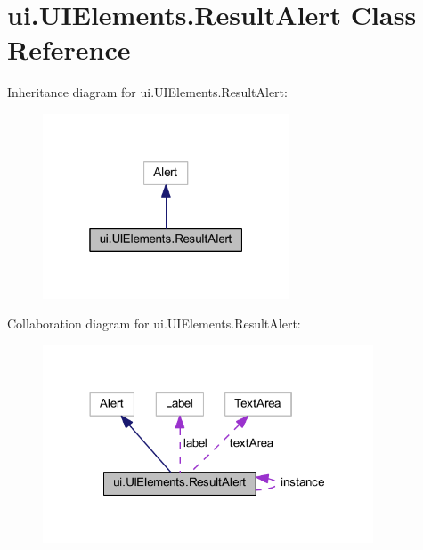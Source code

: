 \hypertarget{classui_1_1_u_i_elements_1_1_result_alert}{}\section{ui.\+U\+I\+Elements.\+Result\+Alert Class Reference}
\label{classui_1_1_u_i_elements_1_1_result_alert}


Inheritance diagram for ui.\+U\+I\+Elements.\+Result\+Alert\+:
\nopagebreak
\begin{figure}[H]
\begin{center}
\leavevmode
\includegraphics[width=208pt]{classui_1_1_u_i_elements_1_1_result_alert__inherit__graph}
\end{center}
\end{figure}


Collaboration diagram for ui.\+U\+I\+Elements.\+Result\+Alert\+:
\nopagebreak
\begin{figure}[H]
\begin{center}
\leavevmode
\includegraphics[width=278pt]{classui_1_1_u_i_elements_1_1_result_alert__coll__graph}
\end{center}
\end{figure}
